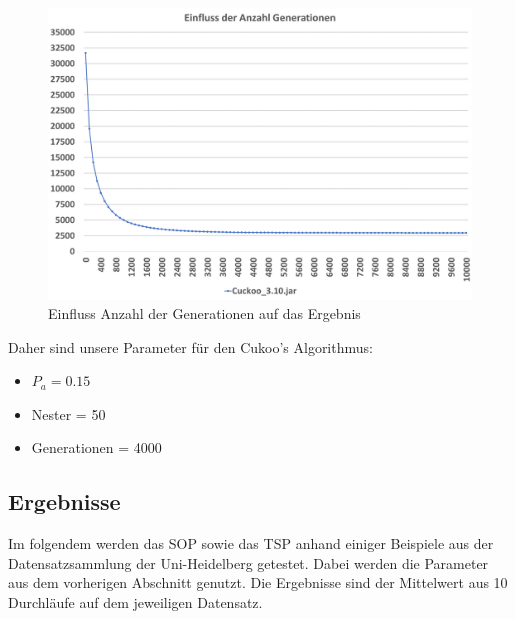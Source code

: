 \documentclass[conference]{IEEEtran}
\begin{document}
      \begin{figure}[]
        \centering
        \includegraphics[width=1\linewidth]{Generation2.png}
        \caption{Einfluss Anzahl der Generationen auf das Ergebnis}
        \label{fig:generation}
      \end{figure}

      Daher sind unsere Parameter für den Cukoo's Algorithmus:
      \begin{itemize}
        \item $P_a = 0.15$
        \item Nester = 50
        \item Generationen = 4000
      \end{itemize}

    \subsection{Ergebnisse}
      Im folgendem werden das SOP sowie das TSP anhand einiger Beispiele aus der Datensatzsammlung der Uni-Heidelberg \cite{b12}getestet.
      Dabei werden die Parameter aus dem vorherigen Abschnitt genutzt. 
      Die Ergebnisse sind der Mittelwert aus 10 Durchläufe auf dem jeweiligen Datensatz.
\end{document}
